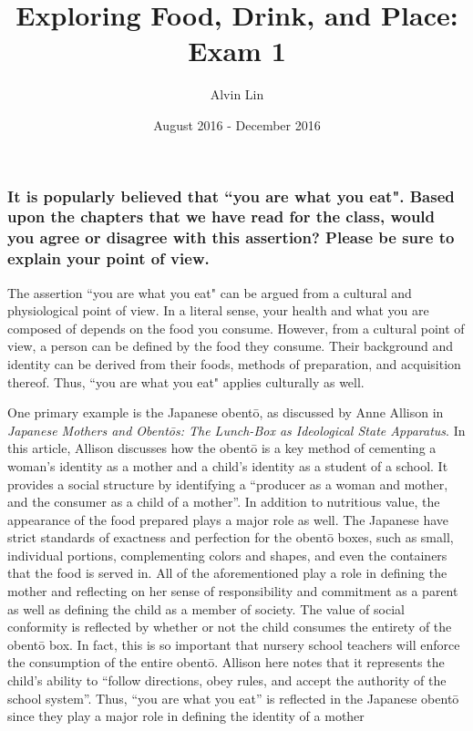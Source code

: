 \documentclass[letterpaper, 12pt]{article}
\title{Exploring Food, Drink, and Place: Exam 1}
\author{Alvin Lin}
\date{August 2016 - December 2016}
\begin{document}
\maketitle

\subsubsection*{It is popularly believed that ``you are what you eat". Based
upon the chapters that we have read for the class, would you agree or disagree
with this assertion? Please be sure to explain your point of view.}

The assertion ``you are what you eat" can be argued from a cultural and
physiological point of view. In a literal sense, your health and what you are
composed of depends on the food you consume. However, from a cultural point of
view, a person can be defined by the food they consume. Their background
and identity can be derived from their foods, methods of preparation, and
acquisition thereof. Thus, ``you are what you eat" applies culturally as
well. \par
One primary example is the Japanese obent\={o}, as discussed by Anne Allison in
\textit{Japanese Mothers and Obent\={o}s: The Lunch-Box as Ideological State
Apparatus}. In this article, Allison discusses how the obent\={o} is a key
method of cementing a woman's identity as a mother and a child's identity as
a student of a school. It provides a social structure by identifying a
``producer as a woman and mother, and the consumer as a child of a mother''. In
addition to nutritious value, the appearance of the food prepared plays a major
role as well. The Japanese have strict standards of exactness and perfection
for the obent\={o} boxes, such as small, individual portions, complementing
colors and shapes, and even the containers that the food is served in. All of
the aforementioned play a role in defining the mother and reflecting on her
sense of responsibility and commitment as a parent as well as defining the
child as a member of society. The value of social conformity is reflected by
whether or not the child consumes the entirety of the obent\={o} box. In fact,
this is so important that nursery school teachers will enforce the consumption
of the entire obent\={o}. Allison here notes that it represents the child's
ability to ``follow directions, obey rules, and accept the authority of the
school system''. Thus, ``you are what you eat'' is reflected in the Japanese
obent\={o} since they play a major role in defining the identity of a mother
\end{document}
